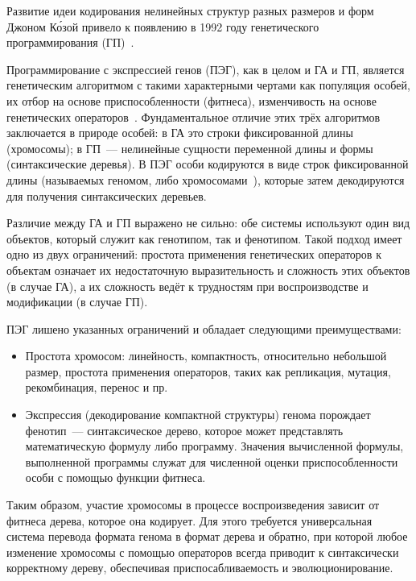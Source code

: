 Развитие идеи кодирования нелинейных структур разных размеров и форм Джоном К\'{о}зой привело к появлению в 1992 году генетического программирования (ГП)~\cite{Koza92}.

Программирование с экспрессией генов (ПЭГ), как в целом и ГА и ГП, является генетическим алгоритмом с такими характерными чертами как популяция особей, их отбор на основе приспособленности (фитнеса), изменчивость на основе генетических операторов~\cite{Ferreira2001}. Фундаментальное отличие этих трёх алгоритмов заключается в природе особей: в ГА это строки фиксированной длины (хромосомы); в ГП~--- нелинейные сущности переменной длины и формы (синтаксические деревья). В ПЭГ особи кодируются в виде строк фиксированной длины (называемых геномом, либо хромосомами~\cite{ferreira:2001:wsc6Aa}), которые затем декодируются для получения синтаксических деревьев.

Различие между ГА и ГП выражено не сильно: обе системы используют один вид объектов, который служит как генотипом, так и фенотипом. Такой подход имеет одно из двух ограничений: простота применения генетических операторов к объектам означает их недостаточную выразительность и сложность этих объектов (в случае ГА), а их сложность ведёт к трудностям при воспроизводстве и модификации (в случае ГП).

ПЭГ лишено указанных ограничений и обладает следующими преимуществами:
\begin{itemize}
  \item Простота хромосом: линейность, компактность, относительно небольшой размер, простота применения операторов, таких как репликация, мутация, рекомбинация, перенос и пр.
  \item Экспрессия (декодирование компактной структуры) генома порождает фенотип~--- синтаксическое дерево, которое может представлять математическую формулу либо программу. Значения вычисленной формулы, выполненной программы служат для численной оценки приспособленности особи с помощью функции фитнеса.
\end{itemize}

Таким образом, участие хромосомы в процессе воспроизведения зависит от фитнеса дерева, которое она кодирует. Для этого требуется универсальная система перевода формата генома в формат дерева и обратно, при которой любое изменение хромосомы с помощью операторов всегда приводит к синтаксически корректному дереву, обеспечивая приспосабливаемость и эволюционирование.






